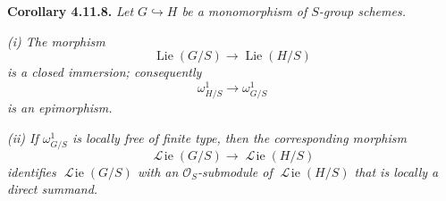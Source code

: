 \medskip
\noindent\textbf{Corollary 4.11.8.}
\textit{Let \(G\hookrightarrow H\) be a monomorphism of
\(S\)-group schemes.}

\textit{(i) The morphism}
\[
 \operatorname{Lie}(G/S)\longrightarrow\operatorname{Lie}(H/S)
\]
\textit{is a closed immersion; consequently}
\[
 \omega^1_{H/S}\longrightarrow\omega^1_{G/S}
\]
\textit{is an epimorphism.}

\textit{(ii) If \(\omega^1_{G/S}\) is locally free of finite type,
then the corresponding morphism}
\[
 \mathop{\mathscr L\!ie}(G/S)\longrightarrow
 \mathop{\mathscr L\!ie}(H/S)
\]
\textit{identifies \(\mathop{\mathscr L\!ie}(G/S)\) with an
\(\mathcal O_S\)-submodule of \(\mathop{\mathscr L\!ie}(H/S)\) that is locally
a direct summand.}

